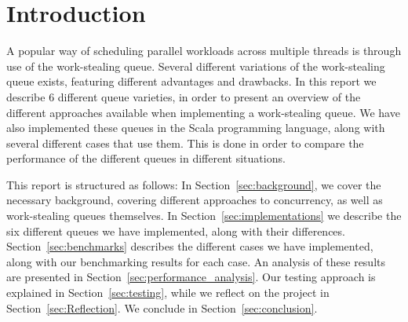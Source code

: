\section{Introduction}
\label{sec:introduction}
A popular way of scheduling parallel workloads across multiple threads is
through use of the work-stealing queue. Several different variations of the
work-stealing queue exists, featuring different advantages and drawbacks. In
this report we describe 6 different queue varieties, in order to present an
overview of the different approaches available when implementing a
work-stealing queue. We have also implemented these queues in the Scala
programming language, along with several different cases that use them. This is
done in order to compare the performance of the different queues in different
situations. 

This report is structured as follows: In Section~\ref{sec:background}, we cover
the necessary background, covering different approaches to concurrency, as well
as work-stealing queues themselves. In Section~\ref{sec:implementations} we
describe the six different queues we have implemented, along with their
differences. Section~\ref{sec:benchmarks} describes the different cases we have
implemented, along with our benchmarking results for each case. An analysis of
these results are presented in Section~\ref{sec:performance_analysis}. Our
testing approach is explained in Section~\ref{sec:testing}, while we reflect
on the project in Section~\ref{sec:Reflection}. We conclude in 
Section~\ref{sec:conclusion}.

